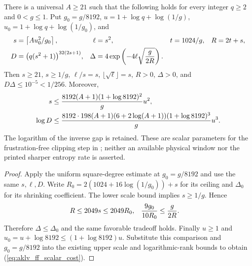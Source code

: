\begin{lemma}
    \label{lem:aklv_frustration_free_scalar_parameters}
    \leanok
    There is a universal $A\ge21$ such that the following holds for every
    integer $q\ge2$ and $0<g\le1$. Put $g_0=g/8192$,
    $u=1+\log q+\log(1/g)$, $u_0=1+\log q+\log(1/g_0)$, and
    \begin{align}
        s      & =\left\lceil Au_0^2/g_0\right\rceil,          &
        \ell   & =s^2,                                         & t & =1024/g, & R & =2t+s,\notag \\
        D      & =\bigl(q(s^2+1)\bigr)^{32(2s+1)},             &
        \Delta & =4\exp\left(-4\ell\sqrt{\frac{g}{2R}}\right).
        \label{eq:aklv_ff_scalar_choice}
    \end{align}
    Then $s\ge21$, $s\ge1/g$, $\ell/s=s$, $\lfloor\sqrt\ell\rfloor=s$,
    $R>0$, $\Delta>0$, and $D\Delta\le10^{-5}<1/256$.
    Moreover,
    \begin{align}
        s      & \le\frac{8192(A+1)(1+\log8192)^2}{g}u^2,\notag \\
        \log D & \le
        \frac{8192\cdot198(A+1)(6+2\log(A+1))(1+\log8192)^3}{g}u^3.
        \label{eq:aklv_ff_scalar_cost}
    \end{align}
    The logarithm of the inverse gap is retained. These are scalar
    parameters for the frustration-free clipping step in
    \cite[Section~4, frustration-free area law]{Arad2013AreaLaw}; neither an
    available physical window nor the printed sharper entropy rate is asserted.
\end{lemma}
\begin{proof}
    \leanok
    Apply the uniform square-degree estimate at $g_0=g/8192$ and use the
    same $s,\ell,D$. Write $R_0=2(1024+16\log(1/g_0))+s$ for its ceiling
    and $\Delta_0$ for its shrinking coefficient. The lower scale bound
    implies $s\ge1/g$. Hence
    \begin{align}
        R                  & \le2049s\le2049R_0, &
        \frac{9g_0}{10R_0} & \le\frac{g}{2R}.
        \notag
    \end{align}
    Therefore $\Delta\le\Delta_0$ and the same favorable tradeoff holds.
    Finally $u\ge1$ and
    $u_0=u+\log8192\le(1+\log8192)u$.
    Substitute this comparison and $g_0=g/8192$ into the existing upper
    scale and logarithmic-rank bounds to obtain
    (\ref{eq:aklv_ff_scalar_cost}).
\end{proof}

